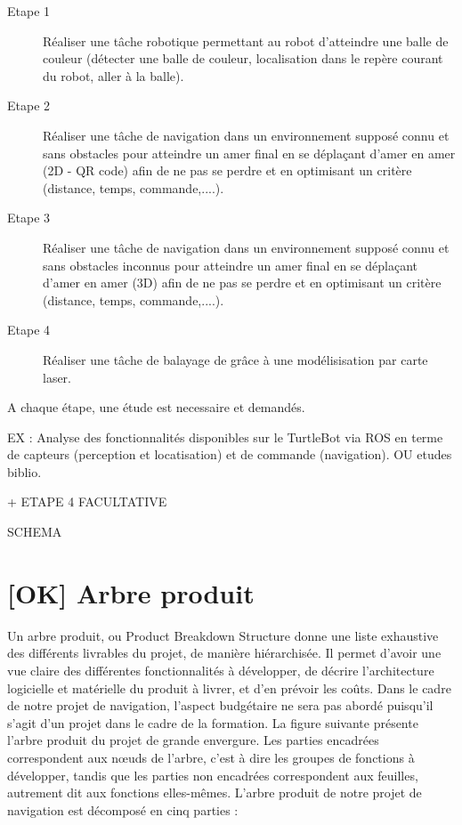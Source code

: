 \documentclass[10pt,a4paper]{article}
\begin{document}
\begin{description}

\item [Etape 1] Réaliser une tâche robotique permettant au robot d’atteindre une balle de couleur (détecter une balle de couleur, localisation dans le repère courant du robot, aller à la balle).

\item [Etape 2] Réaliser une tâche de navigation dans un environnement supposé connu et sans obstacles pour atteindre un amer final en se déplaçant d’amer en amer (2D - QR code) afin de ne pas se perdre et en optimisant un critère (distance, temps, commande,....).

\item [Etape 3] Réaliser une tâche de navigation dans un environnement supposé connu et sans obstacles inconnus pour atteindre un amer final en se déplaçant d’amer en amer (3D) afin de ne pas se perdre et en optimisant un critère (distance, temps, commande,....).

\item [Etape 4] Réaliser une tâche de balayage de grâce à une modélisisation par carte laser.

\end{description}

A chaque étape, une étude est necessaire et demandés. 

EX : Analyse des fonctionnalités disponibles sur le TurtleBot via ROS en terme de capteurs (perception et locatisation) et de commande (navigation). OU etudes biblio.

+ ETAPE 4 FACULTATIVE

SCHEMA

\section{[OK] Arbre produit}

Un arbre produit, ou Product Breakdown Structure donne une liste exhaustive des différents livrables du projet, de manière hiérarchisée. Il permet d’avoir une vue claire des différentes fonctionnalités à développer, de décrire l’architecture logicielle et matérielle du produit à livrer, et d’en prévoir les coûts. Dans le cadre de notre projet de navigation, l’aspect budgétaire ne sera pas abordé puisqu’il s’agit d’un projet dans le cadre de la formation.
La figure suivante présente l’arbre produit du projet de grande envergure. Les parties encadrées correspondent aux nœuds de l’arbre, c’est à dire les groupes de fonctions à développer, tandis que les parties non encadrées correspondent aux feuilles, autrement dit aux fonctions elles-mêmes.
L’arbre produit de notre projet de navigation est décomposé en cinq parties :
\end{document}
